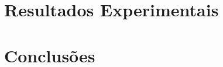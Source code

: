 \documentclass[a4paper,12pt,oneside,openany]{book}
\begin{document}
\chapter{Resultados Experimentais}
\label{ch:cap5}

\chapter{Conclusões}
\label{ch:cap6}

\normalsize
\cleardoublepage
{}




\backmatter
\end{document}
